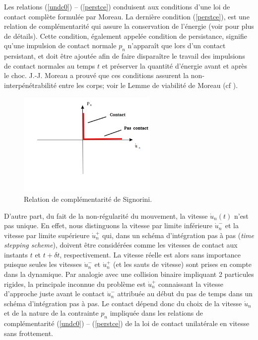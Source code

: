 Les relations (\ref{undc0}) -- (\ref{perstce}) conduisent aux conditions d'une loi de contact complète formulée par Moreau. La dernière condition (\ref{perstce}), est une relation de complémentarité qui assure la conservation de l'énergie (voir \cite{dubois2018contact} pour plus de détails). Cette condition, également appelée condition de persistance, signifie qu'une impulsion de contact normale $p_n$ n'apparaît que lors d'un contact persistant, et doit être ajoutée afin de faire disparaître le travail des impulsions de contact normales au temps $t$ et préserver la quantité d'énergie avant et après le choc. J.-J. Moreau a prouvé que ces conditions assurent la non-interpénétrabilité entre les corps; voir le Lemme de viabilité de Moreau (cf \cite{moreau1994numerical, moreau1999sweeping}).

\begin{figure}[!h]
  \centering
    \includegraphics[width=0.6\textwidth]{chapitres/chapitre_3/figures/signorini_complementarity_relation.png}
    \caption{Relation de complémentarité de Signorini.}\label{fig3}
\end{figure}

D'autre part, du fait de la non-régularité du mouvement, la vitesse $\dot{u}_n(t)$ n'est pas unique. En effet, nous distinguons la vitesse par limite inférieure $\dot{u}_n^{-}$ et la vitesse par limite supérieure $\dot{u}_n^{+}$ qui, dans un schéma d'intégration pas à pas (\textit{time stepping scheme}), doivent être considérées comme les vitesses de contact aux instants $t$ et $t + \delta{t}$, respectivement. La vitesse réelle est alors sans importance puisque seules les vitesses $\dot{u}_n^{-}$ et $\dot{u}_n^{+}$ (et les sauts de vitesse) sont prises en compte dans la dynamique. Par analogie avec une collision binaire impliquant 2 particules rigides, la principale inconnue du problème est $\dot{u}_n^{+}$ connaissant la vitesse d'approche juste avant le contact $\dot{u}_n^{-}$ attribuée au début du pas de temps dans un schéma d'intégration pas à pas. Le contact dépend donc du choix de la vitesse $\dot{u}_n$ et de la nature de la contrainte $p_n$ impliquée dans les relations de complémentarité (\ref{undc0}) -- (\ref{perstce}) de la loi de contact unilatérale en vitesse sans frottement.

